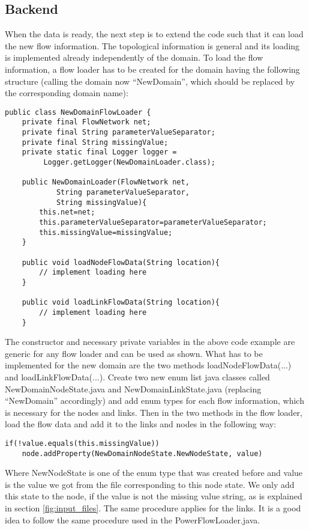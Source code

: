 \documentclass[11pt,fleqn]{book} %
\begin{document}
\subsection{Backend}
When the data is ready, the next step is to extend the code such that it can load the new flow information. The topological information is general and its loading is implemented already independently of the domain. To load the flow information, a flow loader has to be created for the domain having the following structure (calling the domain now “NewDomain”, which should be replaced by the corresponding domain name):

\begin{lstlisting}[frame=single]
public class NewDomainFlowLoader {
    private final FlowNetwork net;
    private final String parameterValueSeparator;
    private final String missingValue;
    private static final Logger logger =
    	 Logger.getLogger(NewDomainLoader.class);
    
    public NewDomainLoader(FlowNetwork net, 
	    	String parameterValueSeparator, 
    		String missingValue){
        this.net=net;
        this.parameterValueSeparator=parameterValueSeparator;
        this.missingValue=missingValue;
    }
    
    public void loadNodeFlowData(String location){
        // implement loading here
    }
    
    public void loadLinkFlowData(String location){
        // implement loading here
    }
\end{lstlisting}

The constructor and necessary private variables in the above code example are generic for any flow loader and can be used as shown. What has to be implemented for the new domain are the two methods loadNodeFlowData(...) and loadLinkFlowData(...). Create two new enum list java classes called NewDomainNodeState.java and NewDomainLinkState.java (replacing “NewDomain” accordingly) and add enum types for each flow information, which is necessary for the nodes and links. Then in the two methods in the flow loader, load the flow data and add it to the links and nodes in the following way:
\begin{lstlisting}
if(!value.equals(this.missingValue))
	node.addProperty(NewDomainNodeState.NewNodeState, value)
\end{lstlisting}
Where NewNodeState is one of the enum type that was created before and value is the value we got from the file corresponding to this node state. We only add this state to the node, if the value is not the missing value string, as is explained in section \ref{fig:input_files}. The same procedure applies for the links. It is a good idea to follow the same procedure used in the PowerFlowLoader.java.
\end{document}
